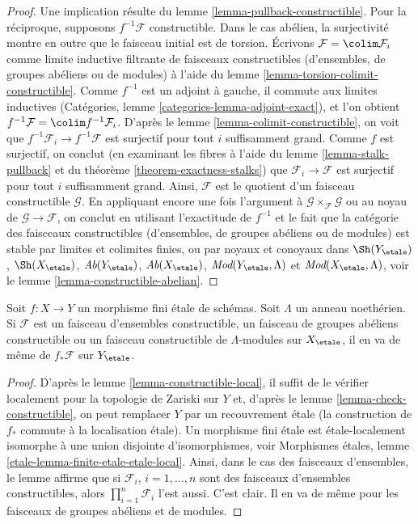 \begin{proof}
Une implication r\'esulte du lemme \ref{lemma-pullback-constructible}.
Pour la r\'eciproque, supposons $f^{-1}\mathcal{F}$ constructible. Dans le cas ab\'elien,
la surjectivit\'e montre en outre que le faisceau initial est de torsion. \'Ecrivons $\mathcal{F} = \colim \mathcal{F}_i$ comme
limite inductive filtrante de faisceaux constructibles (d'ensembles, de groupes ab\'eliens ou de modules)
\`a l'aide du lemme \ref{lemma-torsion-colimit-constructible}.
Comme $f^{-1}$ est un adjoint \`a gauche, il commute aux limites inductives
(Catégories, lemme \ref{categories-lemma-adjoint-exact}), et l'on obtient
$f^{-1}\mathcal{F} = \colim f^{-1}\mathcal{F}_i$.
D'apr\`es le lemme \ref{lemma-colimit-constructible}, on voit que
$f^{-1}\mathcal{F}_i \to f^{-1}\mathcal{F}$
est surjectif pour tout $i$ suffisamment grand.
Comme $f$ est surjectif, on conclut (en examinant les fibres \`a l'aide du
lemme \ref{lemma-stalk-pullback} et du
th\'eor\`eme \ref{theorem-exactness-stalks})
que $\mathcal{F}_i \to \mathcal{F}$ est surjectif pour tout $i$ suffisamment grand.
Ainsi, $\mathcal{F}$ est le quotient d'un faisceau constructible $\mathcal{G}$.
En appliquant encore une fois l'argument \`a
$\mathcal{G} \times_\mathcal{F} \mathcal{G}$ ou
au noyau de $\mathcal{G} \to \mathcal{F}$,
on conclut en utilisant l'exactitude de $f^{-1}$ et le fait que la cat\'egorie des
faisceaux constructibles (d'ensembles, de groupes ab\'eliens ou de modules) est
stable par limites et colimites finies, ou par noyaux et conoyaux dans
$\Sh(Y_\etale)$, $\Sh(X_\etale)$, $\textit{Ab}(Y_\etale)$,
$\textit{Ab}(X_\etale)$, $\textit{Mod}(Y_\etale, \Lambda)$ et
$\textit{Mod}(X_\etale, \Lambda)$, voir le
lemme \ref{lemma-constructible-abelian}.
\end{proof}

\begin{lemma}
\label{lemma-pushforward-constructible}
Soit $f : X \to Y$ un morphisme fini \'etale de sch\'emas. Soit $\Lambda$ un
anneau noeth\'erien. Si $\mathcal{F}$ est un faisceau d'ensembles constructible,
un faisceau de groupes ab\'eliens constructible ou un faisceau constructible de
$\Lambda$-modules sur $X_\etale$, il en va de m\^eme de
$f_*\mathcal{F}$ sur $Y_\etale$.
\end{lemma}

\begin{proof}
D'apr\`es le lemme \ref{lemma-constructible-local}, il suffit de le v\'erifier
localement pour la topologie de Zariski sur $Y$ et, d'apr\`es le lemme \ref{lemma-check-constructible},
on peut remplacer $Y$ par un recouvrement \'etale (la construction de $f_*$
commute \`a la localisation \'etale). Un morphisme fini \'etale est
\'etale-localement isomorphe \`a une union disjointe d'isomorphismes, voir
Morphismes étales, lemme \ref{etale-lemma-finite-etale-etale-local}.
Ainsi, dans le cas des faisceaux d'ensembles, le lemme affirme que si
$\mathcal{F}_i$, $i = 1, \ldots, n$ sont des faisceaux d'ensembles constructibles, alors
$\prod_{i = 1}^n \mathcal{F}_i$ l'est aussi.
C'est clair. Il en va de m\^eme pour les faisceaux de groupes ab\'eliens et de modules.
\end{proof}

